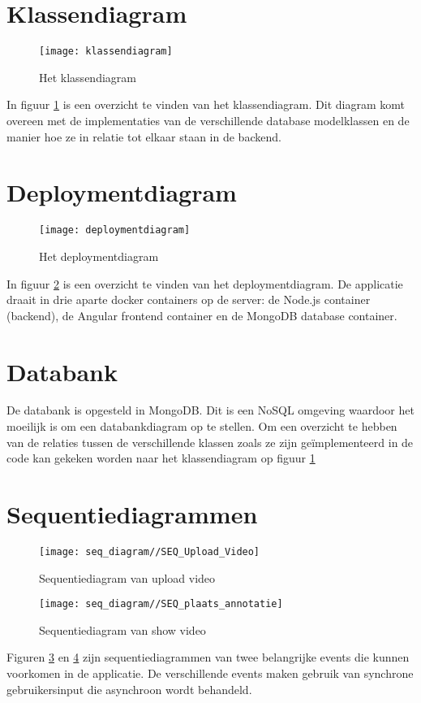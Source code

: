 \section{Klassendiagram}
\begin{figure}[ht]
	\texttt{[image: klassendiagram]}
	\caption{Het klassendiagram}
	\label{fig:klassendiagram}
\end{figure}

In figuur \ref{fig:klassendiagram} is een overzicht te vinden van het klassendiagram. Dit diagram komt overeen met de implementaties van de verschillende database modelklassen en de manier hoe ze in relatie tot elkaar staan in de backend.

\section{Deploymentdiagram}
\begin{figure}[ht]
	\texttt{[image: deploymentdiagram]}
	\caption{Het deploymentdiagram}
	\label{fig:deploymentdiagram}
\end{figure}
In figuur \ref{fig:deploymentdiagram} is een overzicht te vinden van het deploymentdiagram. De applicatie draait in drie aparte docker containers op de server: de Node.js container (backend), de Angular frontend container en de MongoDB database container. 

\section{Databank}
De databank is opgesteld in MongoDB. Dit is een NoSQL omgeving waardoor het moeilijk is om een databankdiagram op te stellen. Om een overzicht te hebben van de relaties tussen de verschillende klassen zoals ze zijn ge\"implementeerd in de code kan gekeken worden naar het klassendiagram op figuur \ref{fig:klassendiagram}


\section{Sequentiediagrammen}

\begin{figure}
	\texttt{[image: seq\_diagram//SEQ\_Upload\_Video]}
	\caption{Sequentiediagram van upload video}
	\label{fig:seq_upload_video}
\end{figure}

\begin{figure}
	\texttt{[image: seq\_diagram//SEQ\_plaats\_annotatie]}
	\caption{Sequentiediagram van show video}
	\label{fig:seq_show_video}
\end{figure}
Figuren \ref{fig:seq_upload_video} en \ref{fig:seq_show_video} zijn sequentiediagrammen van twee belangrijke events die kunnen voorkomen in de applicatie. De verschillende events maken gebruik van synchrone gebruikersinput die asynchroon wordt behandeld.
